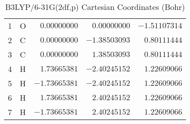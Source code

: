 \documentclass[10pt,oneside]{article}
\begin{document}
\begin{table}[h!]
\centering
\caption{B3LYP/6-31G(2df,p) Cartesian Coordinates (Bohr)}
\begin{tabular}{llrrr}
1  & O  & $ 0.00000000$ & $ 0.00000000$ & $-1.51107314$ \\
2  & C  & $ 0.00000000$ & $-1.38503093$ & $ 0.80111444$ \\
3  & C  & $ 0.00000000$ & $ 1.38503093$ & $ 0.80111444$ \\
4  & H  & $ 1.73665381$ & $-2.40245152$ & $ 1.22609066$ \\
5  & H  & $-1.73665381$ & $-2.40245152$ & $ 1.22609066$ \\
6  & H  & $ 1.73665381$ & $ 2.40245152$ & $ 1.22609066$ \\
7  & H  & $-1.73665381$ & $ 2.40245152$ & $ 1.22609066$ \\
\end{tabular}
\end{table}

\clearpage
\end{document}
